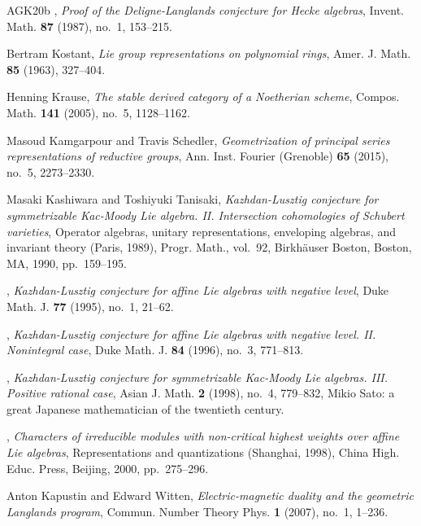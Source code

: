 \begin{thebibliography}{AGK{\etalchar{+}}20b}
\bysame, \emph{Proof of the {D}eligne-{L}anglands conjecture for {H}ecke
  algebras}, Invent. Math. \textbf{87} (1987), no.~1, 153--215.

Bertram Kostant, \emph{Lie group representations on polynomial rings}, Amer. J.
  Math. \textbf{85} (1963), 327--404.

Henning Krause, \emph{The stable derived category of a {N}oetherian scheme},
  Compos. Math. \textbf{141} (2005), no.~5, 1128--1162.

Masoud Kamgarpour and Travis Schedler, \emph{Geometrization of principal series
  representations of reductive groups}, Ann. Inst. Fourier (Grenoble)
  \textbf{65} (2015), no.~5, 2273--2330.

Masaki Kashiwara and Toshiyuki Tanisaki, \emph{Kazhdan-{L}usztig conjecture for
  symmetrizable {K}ac-{M}oody {L}ie algebra. {II}. {I}ntersection cohomologies
  of {S}chubert varieties}, Operator algebras, unitary representations,
  enveloping algebras, and invariant theory ({P}aris, 1989), Progr. Math.,
  vol.~92, Birkh\"{a}user Boston, Boston, MA, 1990, pp.~159--195.

\bysame, \emph{Kazhdan-{L}usztig conjecture for affine {L}ie algebras with
  negative level}, Duke Math. J. \textbf{77} (1995), no.~1, 21--62.

\bysame, \emph{Kazhdan-{L}usztig conjecture for affine {L}ie algebras with
  negative level. {II}. {N}onintegral case}, Duke Math. J. \textbf{84} (1996),
  no.~3, 771--813.

\bysame, \emph{Kazhdan-{L}usztig conjecture for symmetrizable {K}ac-{M}oody
  {L}ie algebras. {III}. {P}ositive rational case}, Asian J. Math. \textbf{2}
  (1998), no.~4, 779--832, Mikio Sato: a great Japanese mathematician of the
  twentieth century.

\bysame, \emph{Characters of irreducible modules with non-critical highest
  weights over affine {L}ie algebras}, Representations and quantizations
  ({S}hanghai, 1998), China High. Educ. Press, Beijing, 2000, pp.~275--296.

Anton Kapustin and Edward Witten, \emph{Electric-magnetic duality and the
  geometric {L}anglands program}, Commun. Number Theory Phys. \textbf{1}
  (2007), no.~1, 1--236.


\end{thebibliography}
